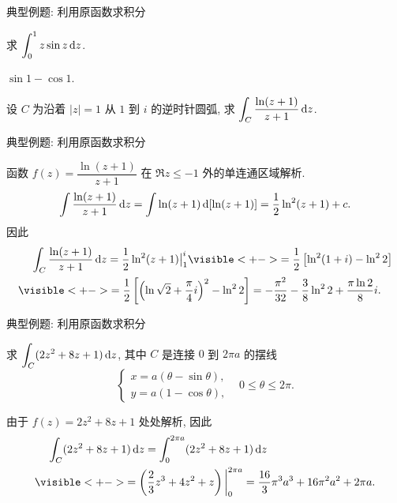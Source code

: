 \begin{frame}{典型例题: 利用原函数求积分}
\begin{exercise}
求 $\displaystyle\int_0^1 z\sin z\,\mathrm{d} z$.
\end{exercise}

\begin{answer}
$\sin 1-\cos 1$.
\end{answer}
\begin{example}
设 $C$ 为沿着 $|z|=1$ 从 $1$ 到 $i$ 的逆时针圆弧, 求 $\displaystyle\int_C\frac{\ln(z+1)}{z+1}\,\mathrm{d} z$.
\end{example}
\end{frame}


\begin{frame}{典型例题: 利用原函数求积分}
\begin{solution}
函数 $f(z)=\dfrac{\ln(z+1)}{z+1}$ 在 $\Re z\le -1$ 外的单连通区域解析.
\onslide<+->
\[\int\frac{\ln(z+1)}{z+1}\,\mathrm{d} z
=\int\ln(z+1)\,\mathrm{d}[\ln(z+1)]=\frac12\ln^2(z+1)+c.\]
\onslide<+->
因此
\begin{align*}
&\peq\int_C\frac{\ln(z+1)}{z+1}\diff z=\frac12\ln^2(z+1)\big|_1^i
\visible<+->{=\frac12\left[\ln^2(1+i)-\ln^22\right]}\\
&\visible<+->{=\frac12\left[\left(\ln\sqrt2+\frac\pi4i\right)^2-\ln^22\right]
=-\frac{\pi^2}{32}-\frac38\ln^22+\frac{\pi\ln2}{8}i.}
\end{align*}
\end{solution}
\end{frame}


\begin{frame}{典型例题: 利用原函数求积分}
\begin{example}
求 $\displaystyle\int_C(2z^2+8z+1)\,\mathrm{d} z$, 其中 $C$ 是连接 $0$ 到 $2\pi a$ 的摆线
\vspace{-8pt}
\[\begin{cases}
x=a(\theta-\sin\theta),& \\ y=a(1-\cos\theta),
\end{cases} 0\le \theta\le 2\pi.\]
\vspace{-8pt}
\end{example}
\begin{solution}
由于 $f(z)=2z^2+8z+1$ 处处解析,
\onslide<+->
因此
\begin{align*}
&\peq\int_C(2z^2+8z+1)\diff z=\int_0^{2\pi a}(2z^2+8z+1)\diff z\\
&\visible<+->{=\left(\frac23z^3+4z^2+z\right)\bigg|_0^{2\pi a}=\frac{16}3\pi^3a^3+16\pi^2a^2+2\pi a.}
\end{align*}
\vspace{-8pt}
\end{solution}
\end{frame}

